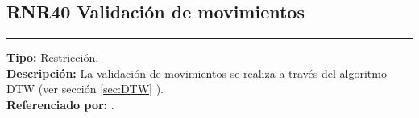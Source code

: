 \subsection{\normalsize{\textcolor[rgb]{0, 0, 0.545098}{RNR40 Validación de movimientos}}}
\label{rn:RNR40}
\rule[3mm]{16.59cm}{0.1mm} \vspace{1mm}
\textbf{Tipo:} Restricción.\\
\textbf{Descripción:} La validación de movimientos se realiza a través del algoritmo DTW (ver sección \ref{sec:DTW} ).\\
\textbf{Referenciado por: }  .\\


\clearpage